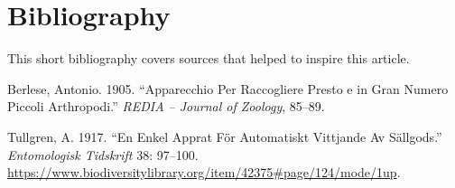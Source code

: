 \documentclass[
]{article}
\newlength{\cslhangindent}
\newlength{\cslentryspacingunit} %
\newenvironment{CSLReferences}[2] %
 {%
  \setlength{\parindent}{0pt}
  \ifodd #1
  \let\oldpar\par
  \def\par{\hangindent=\cslhangindent\oldpar}
  \fi
  \setlength{\parskip}{#2\cslentryspacingunit}
 }%
 {}
\begin{document}
\newpage

\hypertarget{bibliography}{%
\section*{Bibliography}\label{bibliography}}

This short bibliography covers sources that helped to inspire this article.

\hypertarget{refs}{}
\begin{CSLReferences}{1}{0}
\leavevmode{}%
Berlese, Antonio. 1905. {``Apparecchio Per Raccogliere Presto e in Gran Numero Piccoli Arthropodi.''} \emph{REDIA -- Journal of Zoology}, 85--89.

\leavevmode{}%
Tullgren, A. 1917. {``En Enkel Apprat För Automatiskt Vittjande Av Sällgods.''} \emph{Entomologisk Tidskrift} 38: 97--100. \url{https://www.biodiversitylibrary.org/item/42375\#page/124/mode/1up}.

\end{CSLReferences}

\let\cleardoublepage\clearpage
\end{document}
